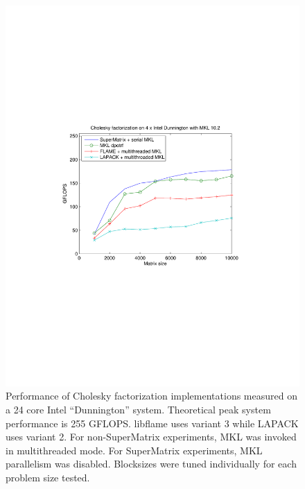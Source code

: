 \begin{figure}[tbp]
\begin{center}

\includegraphics[width=6.5in]{pics/chol_l_dunnington-embedded.pdf}

\end{center}
\caption{
Performance of Cholesky factorization implementations measured on a
24 core Intel ``Dunnington'' system.
Theoretical peak system performance is 255 GFLOPS.
libflame uses variant 3 while LAPACK uses variant 2.
For non-SuperMatrix experiments, MKL was invoked in multithreaded
mode.
For SuperMatrix experiments, MKL parallelism was disabled.
Blocksizes were tuned individually for each problem size tested.
}
\label{fig:chol-perf}
\end{figure}
